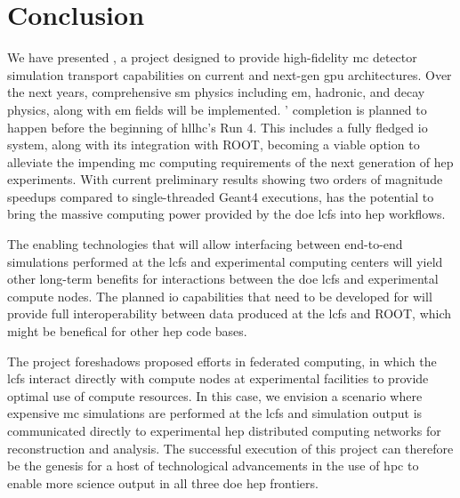 \section{Conclusion}

We have presented \celeritas, a project designed to provide high-fidelity
\ac{mc} detector simulation transport capabilities on current and next-gen
\ac{gpu} architectures. Over the next years, comprehensive \ac{sm} physics
including \ac{em}, hadronic, and decay physics, along with \ac{em} fields will
be implemented. \celeritas' completion is planned to happen before the beginning
of \acs{hllhc}'s Run 4. This includes a fully fledged \ac{io} system, along with
its integration with ROOT, becoming a viable option to alleviate the impending
\ac{mc} computing requirements of the next generation of \ac{hep} experiments.
With current preliminary results showing two orders of magnitude speedups
compared to single-threaded Geant4 executions, \celeritas has the potential to
bring the massive computing power provided by the \ac{doe} \acp{lcf} into
\ac{hep} workflows.

The enabling technologies that will allow interfacing between end-to-end
simulations performed at the \acp{lcf} and experimental computing centers will
yield other long-term benefits for interactions between the \ac{doe} \acp{lcf}
and experimental compute nodes. The planned \ac{io} capabilities that need to be
developed for \celeritas will provide full interoperability between data
produced at the \acp{lcf} and ROOT, which might be benefical for other \ac{hep}
code bases.

The \celeritas project foreshadows proposed efforts in federated computing, in
which the \acp{lcf} interact directly with compute nodes at experimental
facilities to provide optimal use of compute resources.  In this case, we
envision a scenario where expensive \ac{mc} simulations are performed at the
\acp{lcf} and simulation output is communicated directly to experimental
\ac{hep} distributed computing networks for reconstruction and analysis.  The
successful execution of this project can therefore be the genesis for a host of
technological advancements in the use of \ac{hpc} to enable more science output
in all three \ac{doe} \ac{hep} frontiers.
